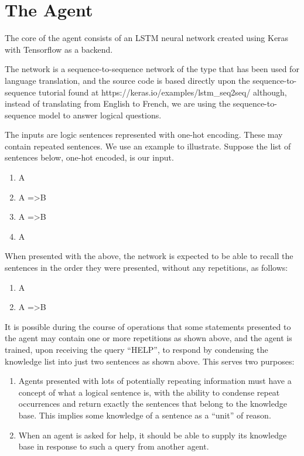 \documentclass{article}
\begin{document}
\section{The Agent}
\label{the_agent}
The core of the agent consists of an LSTM neural network created
using Keras \cite{chollet2015keras}
with Tensorflow \cite{tensorflow2015-whitepaper}
as a backend.

The network is a sequence-to-sequence network of the type that has been used for language translation, and the source code is based directly upon the sequence-to-sequence tutorial found at https://keras.io/examples/lstm\_seq2seq/ although, instead of translating from English to French, we are using the sequence-to-sequence model to answer logical questions.

The inputs are logic sentences represented with one-hot encoding. These may contain repeated sentences. We use an example to illustrate. Suppose the list of sentences below, one-hot encoded, is our input.

\begin{enumerate}
	\item A
	\item A =\textgreater B
	\item A =\textgreater B
	\item A
\end{enumerate}

When presented with the above, the network is expected to be able to recall the sentences in the order they were presented, without any repetitions, as follows:

\begin{enumerate}
	\item A
	\item A =\textgreater B
\end{enumerate}

It is possible during the course of operations that some statements presented to the agent may contain one or more repetitions as shown above, and the agent is trained, upon receiving the query “HELP”, to respond by condensing the knowledge list into just two sentences as shown above. This serves two purposes:

\begin{enumerate}
	\item Agents presented with lots of potentially repeating information must have a concept of what a logical sentence is, with the ability to condense repeat occurrences and return exactly the sentences that belong to the knowledge base. This implies some knowledge of a sentence as a “unit” of reason.
	\item When an agent is asked for help, it should be able to supply its knowledge base in response to such a query from another agent.
\end{enumerate}
\end{document}
